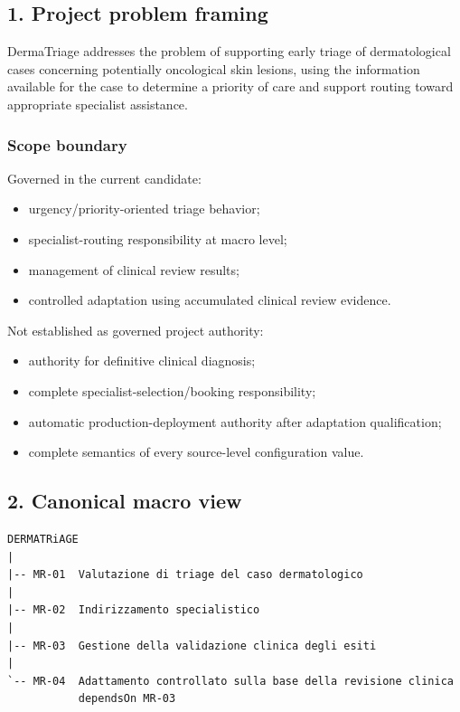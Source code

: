 \documentclass[11pt,a4paper]{article}
\providecommand{\tightlist}{\setlength{\itemsep}{0pt}\setlength{\parskip}{0pt}}
\begin{document}
\subsection{1. Project problem framing}\label{1-project-problem-framing}

DermaTriage addresses the problem of supporting early triage of
dermatological cases concerning potentially oncological skin lesions,
using the information available for the case to determine a priority of
care and support routing toward appropriate specialist assistance.

\subsubsection{Scope boundary}\label{scope-boundary}

Governed in the current candidate:

\begin{itemize}
\tightlist
\item
  urgency/priority-oriented triage behavior;
\item
  specialist-routing responsibility at macro level;
\item
  management of clinical review results;
\item
  controlled adaptation using accumulated clinical review evidence.
\end{itemize}

Not established as governed project authority:

\begin{itemize}
\tightlist
\item
  authority for definitive clinical diagnosis;
\item
  complete specialist-selection/booking responsibility;
\item
  automatic production-deployment authority after adaptation
  qualification;
\item
  complete semantics of every source-level configuration value.
\end{itemize}

\subsection{2. Canonical macro view}\label{2-canonical-macro-view}

\begin{verbatim}
DERMATRiAGE
|
|-- MR-01  Valutazione di triage del caso dermatologico
|
|-- MR-02  Indirizzamento specialistico
|
|-- MR-03  Gestione della validazione clinica degli esiti
|
`-- MR-04  Adattamento controllato sulla base della revisione clinica
           dependsOn MR-03
\end{verbatim}
\end{document}
